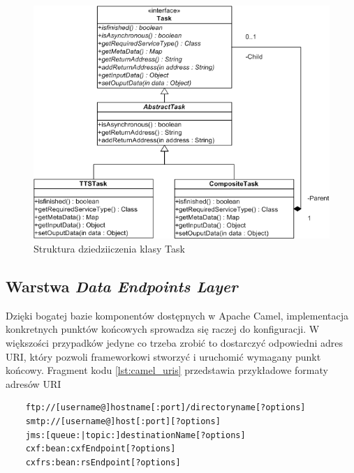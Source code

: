 \begin{figure}[!h]
	\centering
	\includegraphics[scale=0.65]{tasks_hierarhy.png}
	\caption{Struktura dziedziiczenia klasy Task}\label{fig:task_class_hierarchy}
\end{figure}


\subsection{Warstwa \textit{Data Endpoints Layer}}

Dzięki bogatej bazie komponentów dostępnych w Apache Camel, implementacja konkretnych punktów końcowych sprowadza się raczej do konfiguracji. W większości przypadków jedyne co trzeba zrobić to dostarczyć odpowiedni adres URI, który pozwoli frameworkowi stworzyć i uruchomić wymagany punkt końcowy. Fragment kodu \ref{lst:camel_uris} przedstawia przykładowe formaty adresów URI

\lstset{language=Java, tabsize=4, caption=Przykładowe formaty adresów URI dla punktów końcowych Apache Camel.,label=lst:camel_uris}
\begin{minipage}{\linewidth}
\begin{center}
\begin{lstlisting}
	ftp://[username@]hostname[:port]/directoryname[?options]
	smtp://[username@]host[:port][?options]
	jms:[queue:|topic:]destinationName[?options]
	cxf:bean:cxfEndpoint[?options]
	cxfrs:bean:rsEndpoint[?options]
\end{lstlisting}
\end{center}
\end{minipage}

